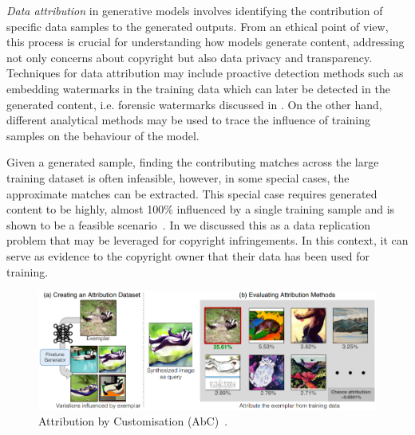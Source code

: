 \documentclass[conference,table]{IEEEtran}
\begin{document}
\textit{Data attribution} in generative models involves identifying the contribution of specific data samples to the generated outputs. 
From an ethical point of view, this process is crucial for understanding how models generate content, addressing not only concerns about copyright but also data privacy and transparency. 
Techniques for data attribution may include proactive detection methods such as embedding watermarks in the training data which can later be detected in the generated content, i.e. forensic watermarks discussed in . 
On the other hand, different analytical methods may be used to trace the influence of training samples on the behaviour of the model. 

Given a generated sample, finding the contributing matches across the large training dataset is often infeasible, however, in some special cases, the approximate matches can be extracted.
This special case requires generated content to be highly, almost 100\% influenced by a single training sample and is shown to be a feasible scenario~\cite{carlini_extracting_2023,somepalli_diffusion_2022}. 
In  we discussed this as a data replication problem that may be leveraged for copyright infringements. 
In this context, it can serve as evidence to the copyright owner that their data has been used for training. 

\begin{figure}
    \centering
    \includegraphics[width=\linewidth]{figures/attribution.PNG}
    \caption{Attribution by Customisation (AbC)~\cite{wang_evaluating_2023}.}
    \label{fig:attribution}
\end{figure}
\end{document}
